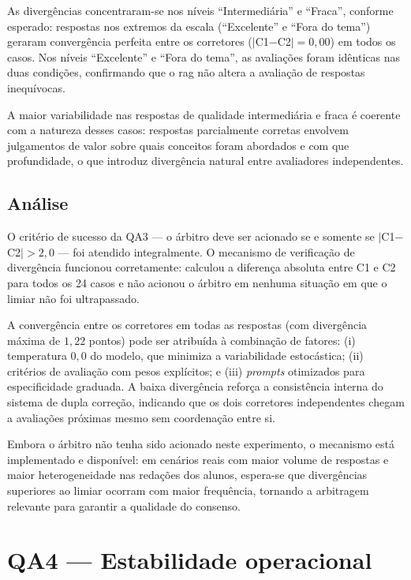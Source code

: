 As divergências concentraram-se nos níveis ``Intermediária'' e ``Fraca'', conforme esperado: respostas nos extremos da escala (``Excelente'' e ``Fora do tema'') geraram convergência perfeita entre os corretores ($|$C1$-$C2$| = 0{,}00$) em todos os casos. Nos níveis ``Excelente'' e ``Fora do tema'', as avaliações foram idênticas nas duas condições, confirmando que o \gls{rag} não altera a avaliação de respostas inequívocas.

A maior variabilidade nas respostas de qualidade intermediária e fraca é coerente com a natureza desses casos: respostas parcialmente corretas envolvem julgamentos de valor sobre quais conceitos foram abordados e com que profundidade, o que introduz divergência natural entre avaliadores independentes.

\subsection{Análise}

O critério de sucesso da QA3 --- o árbitro deve ser acionado se e somente se $|$C1$-$C2$| > 2{,}0$ --- foi atendido integralmente. O mecanismo de verificação de divergência funcionou corretamente: calculou a diferença absoluta entre C1 e C2 para todos os 24 casos e não acionou o árbitro em nenhuma situação em que o limiar não foi ultrapassado.

A convergência entre os corretores em todas as respostas (com divergência máxima de $1{,}22$ pontos) pode ser atribuída à combinação de fatores: (i) temperatura $0{,}0$ do modelo, que minimiza a variabilidade estocástica; (ii) critérios de avaliação com pesos explícitos; e (iii) \textit{prompts} otimizados para especificidade graduada. A baixa divergência reforça a consistência interna do sistema de dupla correção, indicando que os dois corretores independentes chegam a avaliações próximas mesmo sem coordenação entre si.

Embora o árbitro não tenha sido acionado neste experimento, o mecanismo está implementado e disponível: em cenários reais com maior volume de respostas e maior heterogeneidade nas redações dos alunos, espera-se que divergências superiores ao limiar ocorram com maior frequência, tornando a arbitragem relevante para garantir a qualidade do consenso.


\section{QA4 --- Estabilidade operacional}
\label{sec:qa4}

